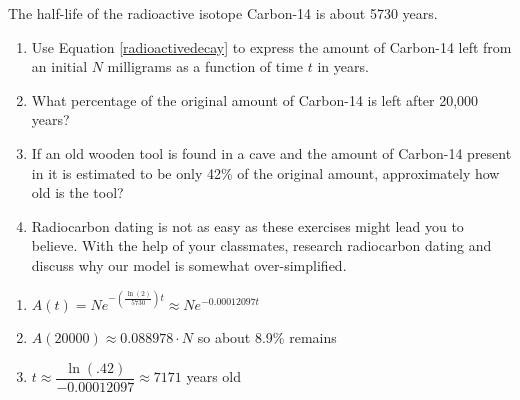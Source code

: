 {The half-life of the radioactive isotope Carbon-14 is about 5730 years.  

\begin{enumerate}

\item Use Equation \ref{radioactivedecay} to express the amount of Carbon-14 left from an initial $N$ milligrams as a function of time $t$ in years.

\item What percentage of the original amount of Carbon-14 is left after 20,000 years?

\item If an old wooden tool is found in a cave and the amount of Carbon-14 present in it is estimated to be only 42\% of the original amount, approximately how old is the tool?

\item Radiocarbon dating is not as easy as these exercises might lead you to believe.  With the help of your classmates, research radiocarbon dating and discuss why our model is somewhat over-simplified.  

\end{enumerate}}
{\begin{enumerate}

\item $A(t) = Ne^{-\left(\frac{\ln(2)}{5730}\right)t} \approx Ne^{-0.00012097t}$
\item $A(20000) \approx 0.088978 \cdot N$ so about 8.9\% remains
\item $t \approx \dfrac{\ln(.42)}{-0.00012097} \approx 7171$ years old

\end{enumerate}}